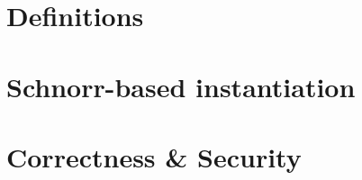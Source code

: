 \section{Definitions} \label{sec:sig:definitions}


\section{Schnorr-based instantiation} \label{sec:sig:schnorr-inst}


\section{Correctness \& Security}\label{sec:sig:two-party-apt-security}


